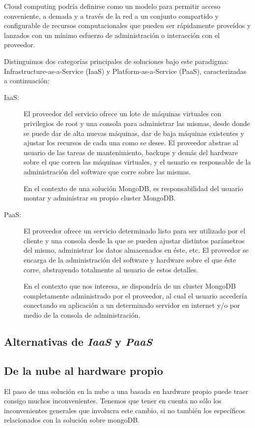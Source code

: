 \documentclass[a4paper,10pt,twoside]{article}
\begin{document}
Cloud computing podría definirse como un modelo para permitir acceso conveniente, a demada y a través de la red a un conjunto compartido y configurable de recursos computacionales que pueden ser rápidamente proveídos y lanzados con un mínimo esfuerzo de administración o interacción con el proveedor.

Distinguimos dos categorías principales de soluciones bajo este paradigma: Infrastructure-as-a-Service (IaaS) y Platform-as-a-Service (PaaS), caracterizadas a continuación:

\begin{description}
	\item[IaaS:] El proveedor del servicio ofrece un lote de máquinas virtuales con privilegios de root y una consola para administrar las mismas, desde donde se puede dar de alta nuevas máquinas, dar de baja máquinas existentes y ajustar los recursos de cada una como se desee. El proveedor abstrae al usuario de las tareas de mantenimiento, backups y demás del hardware sobre el que corren las máquinas virtuales, y el usuario es responsable de la administración del software que corre sobre las mismas.
	
	En el contexto de una solución MongoDB, es responsabilidad del usuario montar y administrar su propio cluster MongoDB.

	\item[PaaS:] El proveedor ofrece un servicio determinado listo para ser utilizado por el cliente y una consola desde la que se pueden ajustar distintos parámetros del mismo, administrar los datos almacenados en éste, etc. El proveedor se encarga de la administración del software y hardware sobre el que éste corre, abstrayendo totalmente al usuario de estos detalles.

	En el contexto que nos interesa, se dispondría de un cluster MongoDB completamente administrado por el proveedor, al cual el usuario accedería conectando su aplicación a un determinado servidor en internet y/o por medio de la consola de administración.
\end{description}


\subsection{Alternativas de \emph{IaaS} y \emph{PaaS}}


\subsection{De la nube al hardware propio}
El paso de una solución en la nube a una basada en hardware propio puede traer consigo muchos inconvenientes. Tenemos que tener en cuenta no sólo los inconvenientes generales que involucra este cambio, si no también los específicos relacionados con la solución sobre mongoDB.
\end{document}
